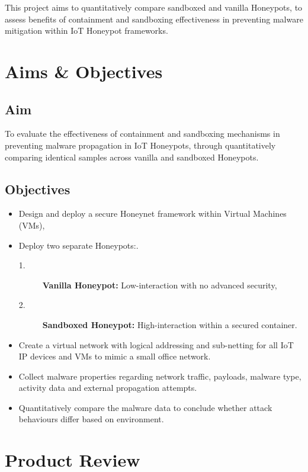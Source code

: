 \documentclass[a4paper,12pt,oneside]{book}			%
\begin{document}
This project aims to quantitatively compare sandboxed and vanilla Honeypots, to assess benefits of containment and sandboxing effectiveness in preventing malware mitigation within IoT Honeypot frameworks. 


\section{Aims \&{} Objectives}\label{sec:aimAndObjectives}

\subsection{Aim}\label{sec:aim}

To evaluate the effectiveness of containment and sandboxing mechanisms in preventing malware propagation in IoT Honeypots, through quantitatively comparing identical samples across vanilla and sandboxed Honeypots.

\subsection{Objectives}\label{sec:objectives}
\begin{itemize}

\item Design and deploy a secure Honeynet framework within Virtual Machines (VMs),
\item Deploy two separate Honeypots:.
\begin{description}
\item[1.] \textbf{Vanilla Honeypot:} Low-interaction with no advanced security,
\item[2.] \textbf{Sandboxed Honeypot:} High-interaction within a secured container.
\end{description}
\item Create a virtual network with logical addressing and sub-netting for all IoT IP devices and VMs to mimic a small office network.
\item Collect malware properties regarding network traffic, payloads, malware type, activity data and external propagation attempts.
\item Quantitatively compare the malware data to conclude whether attack behaviours differ based on environment. 
\end{itemize} 


\section{Product Review}\label{sec:productReview}
\end{document}
